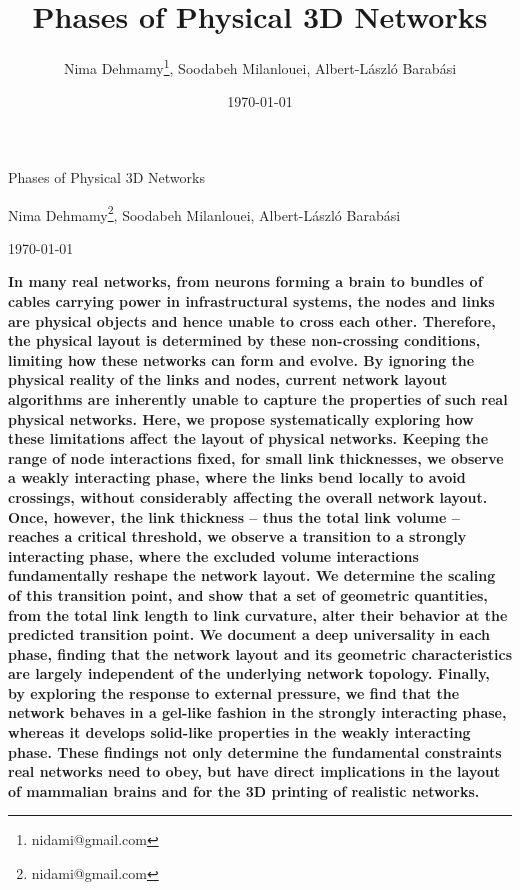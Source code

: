 \documentclass[nofootinbib,preprint,floatfix,titlepage,endfloats]{revtex4} %
\begin{document}
\title{Phases of Physical 3D Networks}
\author{Nima Dehmamy\thanks{nidami@gmail.com}, Soodabeh Milanlouei, Albert-L\'aszl\'o Barab\'asi}
\date{\today}
\centerline{\Huge Phases of Physical 3D Networks}
\medskip
\centerline{Nima Dehmamy\footnote{nidami@gmail.com}, Soodabeh Milanlouei, Albert-L\'aszl\'o Barab\'asi}
\centerline{\today}
\bigskip
{\bf 
In many real networks, from neurons forming a brain to bundles of cables carrying power in infrastructural systems, the nodes and links are physical objects and hence unable to cross each other.
Therefore, the physical layout is determined by these non-crossing conditions, limiting how these networks can form and evolve. 
By ignoring the physical reality of the links and nodes, current network layout algorithms are inherently unable to capture the properties of such real physical networks. 
Here, we propose
systematically exploring how these limitations affect the layout of physical networks. 
Keeping the range of node interactions fixed, for small link thicknesses, we observe a weakly interacting phase, where the links bend locally to avoid crossings, without considerably affecting the overall network layout. 
Once, however, the link thickness -- thus the total link volume -- reaches a critical threshold, we observe a transition to a strongly interacting phase, where the excluded volume interactions fundamentally reshape the network layout. 
We determine the scaling of this transition point, and show that a set of geometric quantities, from the total link length to link curvature, alter their behavior at the predicted transition point. 
We document a deep universality in each phase, finding that the network layout and its geometric characteristics are largely independent of the underlying network topology. 
Finally, by exploring the response to external pressure, we find that the network behaves in a gel-like fashion in the strongly interacting phase, whereas it develops solid-like properties in the weakly interacting phase. 
These findings not only determine the fundamental constraints real networks need to obey, but have direct implications in the layout of mammalian brains and for the 3D printing of realistic networks.
}
\end{document}

